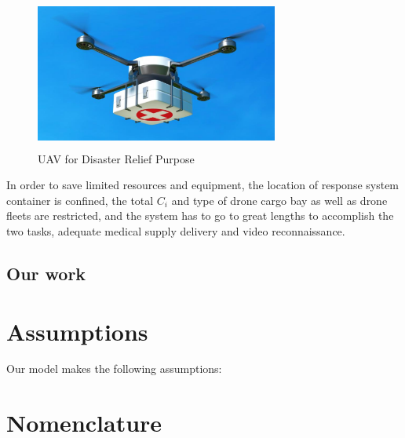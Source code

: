\documentclass{mcmthesis}
\begin{document}
\begin{figure}[htbp]
    \centering
    \includegraphics[height=5cm,width=8cm]{figures/uavdisasterrelief.png}
    \caption{UAV for Disaster Relief Purpose}
    \label{Fig:uavd}
\end{figure}

In order to save limited resources and equipment, the location of response system container is confined, the total $C_i$ and type of drone cargo bay as well as drone fleets are restricted, and the system has to go to great lengths to accomplish the two tasks, adequate medical supply delivery and video reconnaissance. 

\subsection{Our work}


















\section{Assumptions}
Our model makes the following assumptions:











\section{Nomenclature}
\end{document}
